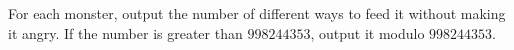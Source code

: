 For each monster, output the number of different ways to feed it
without making it angry.
If the number is greater than $998244353$, output it modulo $998244353$.

